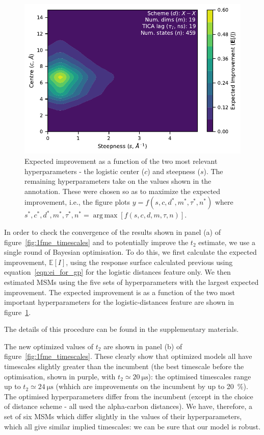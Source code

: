 \documentclass[journal=jacsat,manuscript=article]{achemso}
\DeclareMathOperator*{\argmax}{arg\,max}
\begin{document}
\begin{figure}
    \centering
    \includegraphics{figures/surface_distances_logistic_ei.pdf}
    \caption{Expected improvement as a function of the two most relevant hyperparameters - the logistic center ($c$) and steepness ($s$). The remaining hyperparameters take on the values shown in the annotation. These were chosen so as to maximize the expected improvement, i.e., the figure plots $y=f(s, c, d^{*}, m^{*}, \tau^{*}, n^{*})$ where $s^{*}, c^{*}, d^{*}, m^{*}, \tau^{*}, n^{*} = \argmax \left [f(s, c, d, m, \tau,n)\right]$. }
    \label{fig:ei_surface}
\end{figure}

In order to check the convergence of the results shown in panel (a) of figure~\ref{fig:1fme_timescales} and to potentially improve the $t_2$ estimate,  we use a single round of Bayesian optimisation. To do this, we first calculate the expected improvement, $\mathbb{E}[I]$,  using the response surface calculated previous using equation~\ref{eqn:ei_for_gp} for the logistic distances feature only. We then estimated MSMs using the five sets of hyperparameters with the largest expected improvement. The expected improvement is as a function of the two most important hyperparameters for the logistic-distances feature are shown in figure~\ref{fig:ei_surface}.  

The details of this procedure can be found in the supplementary materials. 

The new optimized values of $t_2$ are shown in panel (b) of figure~\ref{fig:1fme_timescales}.  These clearly show that optimized models all have timescales slightly greater than the incumbent (the best timescale before the optimisation, shown in purple, with $t_2 \simeq \SI{20}{\micro\second}$):  the optimised timescales range up to $t_2 \simeq \SI{24}{\micro\second}$ (whhich are improvements on the incumbent by up to \SI{20}{\percent}). The optimised hyperparameters differ from the incumbent (except in the choice of distance scheme - all used the alpha-carbon distances). We have, therefore, a set of six MSMs which differ slightly in the values of their hyperparameters, which all give similar implied timescales: we can be sure that our model is robust. 
\end{document}
